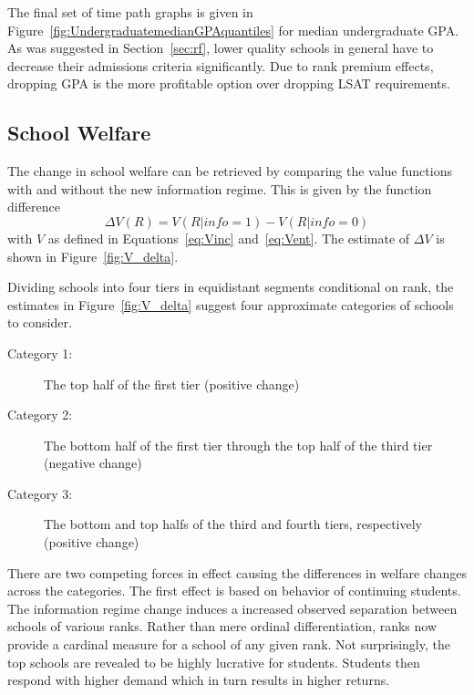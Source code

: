\documentclass[12pt]{article}
\theoremstyle{definition}
\begin{document}
The final set of time path graphs is given in Figure~\ref{fig:UndergraduatemedianGPAquantiles} for median undergraduate GPA. As was suggested in Section~\ref{sec:rf}, lower quality schools in general have to decrease their admissions criteria significantly. Due to rank premium effects, dropping GPA is the more profitable option over dropping LSAT requirements.


\subsection{School Welfare}
\label{sec:welfare_school}
The change in school welfare can be retrieved by comparing the value functions with and without the new information regime. This is given by the function difference
\begin{equation}
  \Delta V(R) = V(R | info=1) - V(R | info=0)
  \label{eq:V_delta}
\end{equation}
with $V$ as defined in Equations~\eqref{eq:Vinc} and~\eqref{eq:Vent}. The estimate of $\Delta V$ is shown in Figure~\ref{fig:V_delta}.

Dividing schools into four tiers in equidistant segments conditional on rank, the estimates in Figure~\ref{fig:V_delta} suggest four approximate categories of schools to consider.

\begin{description}
  \item[Category 1:] The top half of the first tier (positive change)
  \item[Category 2:] The bottom half of the first tier through the top half of the third tier (negative change)
  \item[Category 3:] The bottom and top halfs of the third and fourth tiers, respectively (positive change)
\end{description}

There are two competing forces in effect causing the differences in welfare changes across the categories. The first effect is based on behavior of continuing students. The information regime change induces a increased observed separation between schools of various ranks. Rather than mere ordinal differentiation, ranks now provide a cardinal measure for a school of any given rank. Not surprisingly, the top schools are revealed to be highly lucrative for students. Students then respond with higher demand which in turn results in higher returns.
\end{document}
